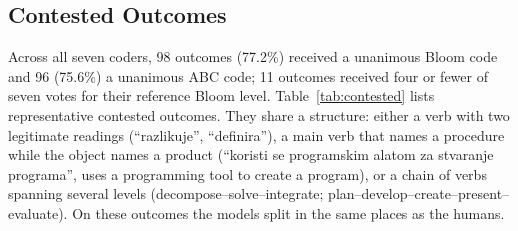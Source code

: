 \documentclass[journal,article,submit,pdftex,moreauthors]{Definitions/mdpi}
\begin{document}
\begin{table}[H]
\caption{Stability and order sensitivity of LLM coding (mean Cohen's $\kappa$). Within-model: the three base runs compared pairwise (range in parentheses). Shuffled vs.\ base: the shuffled run compared with each base run. Last two columns: mean $\kappa$ with the two human coders for base runs / shuffled run.}
\label{tab:stability}
\centering
\footnotesize
\setlength{\tabcolsep}{3pt}
\end{table}

\subsection{Contested Outcomes}
\label{sec:res_contested}

Across all seven coders, 98 outcomes (77.2\%) received a unanimous Bloom code and 96 (75.6\%) a unanimous ABC code; 11 outcomes received four or fewer of seven votes for their reference Bloom level. Table~\ref{tab:contested} lists representative contested outcomes. They share a structure: either a verb with two legitimate readings (``razlikuje'', ``definira''), a main verb that names a procedure while the object names a product (``koristi se programskim alatom za stvaranje programa'', uses a programming tool to create a program), or a chain of verbs spanning several levels (decompose--solve--integrate; plan--develop--create--present--evaluate). On these outcomes the models split in the same places as the humans.
\end{document}

